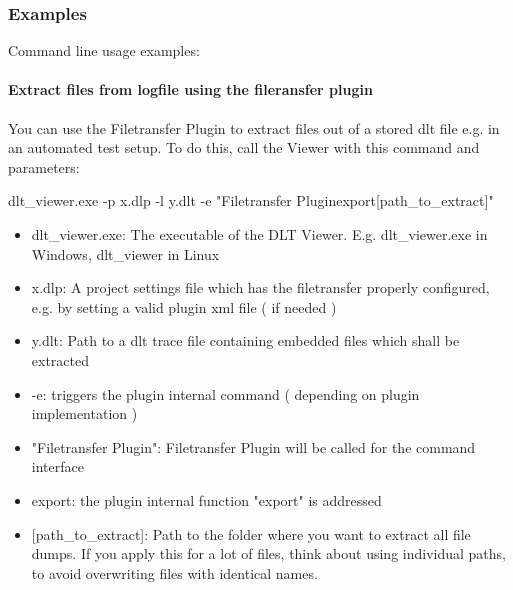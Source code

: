 \documentclass[a4paper,11pt]{article}
\begin{document}
\subsubsection{Examples}



\par
Command line usage examples:


\paragraph{Extract files from logfile using the fileransfer plugin}

You can use the Filetransfer Plugin to extract files out of a stored dlt file e.g. in an automated test setup.
To do this, call the Viewer with this command and parameters:

dlt\_viewer.exe -p x.dlp -l y.dlt -e "Filetransfer Plugin{\textbar}export{\textbar}[path\_to\_extract]"


\begin{itemize}
    \item dlt\_viewer.exe:\linebreak
    The executable of the DLT Viewer. E.g. dlt\_viewer.exe in Windows, dlt\_viewer in Linux
    \item x.dlp:\linebreak
    A project settings file which has the filetransfer properly configured, e.g. by setting a valid plugin xml file ( if needed )
    \item y.dlt:\linebreak
    Path to a dlt trace file containing embedded files which shall be extracted
    \item -e:\linebreak
    triggers the plugin internal command ( depending on plugin implementation )
    \item "Filetransfer Plugin":\linebreak
    Filetransfer Plugin will be called for the command interface
    \item export:\linebreak
    the plugin internal function "export" is addressed
    \item {[path\_to\_extract]}:\linebreak
    Path to the folder where you want to extract all file dumps. If you apply this for a lot of files,
    think about using individual paths, to avoid overwriting files with identical names.
\end{itemize}
\end{document}
